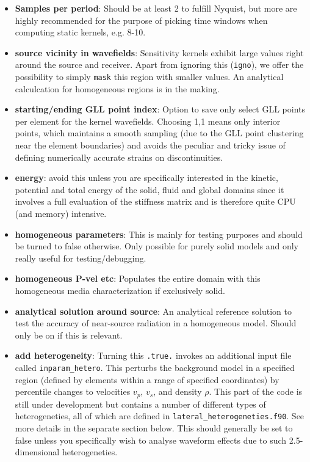 \documentclass[11pt,letter,fleqn,english,notitlepage]{article}
\begin{document}
\begin{itemize}
    \item \textbf{Samples per period}: Should be at least 2 to fulfill Nyquist,
    but more are highly recommended for the purpose of picking time windows
    when computing static kernels, e.g. 8-10.
    
    \item \textbf{source vicinity in wavefields}: Sensitivity kernels exhibit
    large values right around the source and receiver. Apart from ignoring this
    ({\tt igno}), we offer the possibility to simply {\tt mask} this region
    with smaller values.  An analytical calculcation for homogeneous regions is
    in the making.
    
    \item \textbf{starting/ending GLL point index}: Option to save only select
    GLL points per element for the kernel wavefields. Choosing 1,1 means only
    interior points, which maintains a smooth sampling (due to the GLL point
    clustering near the element boundaries) and avoids the peculiar and tricky
    issue of defining numerically accurate strains on discontinuities.
    
    \item  \textbf{energy}: avoid this unless you are specifically interested
    in the kinetic, potential and total energy of the solid, fluid and global
    domains since it involves a full evaluation of the stiffness matrix and is
    therefore quite CPU (and memory) intensive. 
    
    \item  \textbf{homogeneous parameters}: This is mainly for testing purposes
    and should be turned to false otherwise. Only possible for purely solid
    models and only really useful for testing/debugging.
    
    \item \textbf{homogeneous P-vel etc}: Populates the entire domain with this 
    homogeneous media characterization if exclusively solid.
    
    \item \textbf{analytical solution around source}: An analytical reference
    solution to test the accuracy of near-source radiation in a homogeneous
    model. Should only be on if this is relevant.
    
    \item \textbf{add heterogeneity}: Turning this {\tt .true.} invokes an
    additional input file called {\tt inparam\_hetero}.  This perturbs the
    background model in a specified region (defined by elements within a range
    of specified coordinates) by percentile changes to velocities $v_p$, $v_s$,
    and density $\rho$. This part of the code is still under development but
    contains a number of different types of heterogeneties, all of which are
    defined in {\tt lateral\_heterogeneties.f90}. See more details in the
    separate section below.  This should generally be set to false unless you
    specifically wish to analyse waveform effects due to such 2.5-dimensional
    heterogeneties. 
    

\end{itemize}
\end{document}
